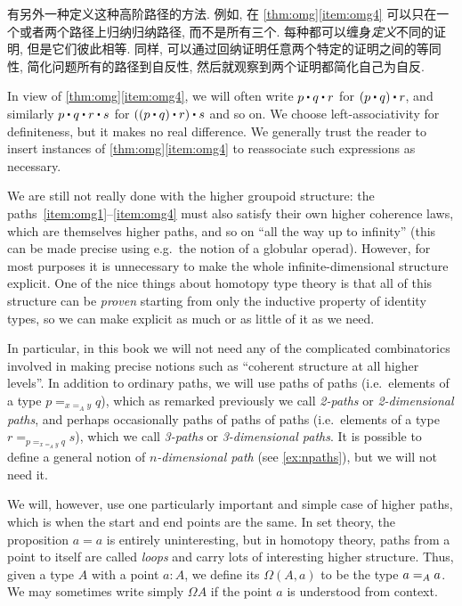 \begin{rmk}
有另外一种定义这种高阶路径的方法.
例如, 在 \cref{thm:omg}\ref{item:omg4} 可以只在一个或者两个路径上归纳归纳路径, 而不是所有三个.
每种都可以缠身\emph{定义}不同的证明, 但是它们彼此相等.
同样, 可以通过回纳证明任意两个特定的证明之间的等同性, 简化问题所有的路径到自反性, 然后就观察到两个证明都简化自己为自反.
\end{rmk}

In view of \cref{thm:omg}\ref{item:omg4}, we will often write $p\ct q\ct r$ for $(p\ct q)\ct r$, and similarly $p\ct q\ct r \ct s$ for $((p\ct q)\ct r)\ct s$ and so on. We choose left-associativity for definiteness, but it makes no real difference. We generally trust the reader to insert instances of \cref{thm:omg}\ref{item:omg4} to reassociate such expressions as necessary. 

We are still not really done with the higher groupoid structure: the paths~\ref{item:omg1}--\ref{item:omg4} must also satisfy their own higher coherence laws, which are themselves higher paths, %
%
%
%
and so on ``all the way up to infinity'' (this can be made precise using e.g.\ the notion of a globular operad). However, for most purposes it is unnecessary to make the whole infinite-dimensional structure explicit. One of the nice things about homotopy type theory is that all of this structure can be \emph{proven} starting from only the inductive property of identity types, so we can make explicit as much or as little of it as we need. 

In particular, in this book we will not need any of the complicated combinatorics involved in making precise notions such as ``coherent structure at all higher levels''. In addition to ordinary paths, we will use paths of paths (i.e.\ elements of a type $p =_{x=_A y} q$), which as remarked previously we call \emph{2-paths} or \emph{2-dimensional paths}, and perhaps occasionally paths of paths of paths (i.e.\ elements of a type $r = _{p =_{x=_A y} q} s$), which we call \emph{3-paths} or \emph{3-dimensional paths}. It is possible to define a general notion of \emph{$n$-dimensional path} %
%
%
%
(see \cref{ex:npaths}), but we will not need it. 

We will, however, use one particularly important and simple case of higher paths, which is when the start and end points are the same. In set theory, the proposition $a=a$ is entirely uninteresting, but in homotopy theory, paths from a point to itself are called \emph{loops} and carry lots of interesting higher structure. Thus, given a type $A$ with a point $a:A$, we define its  %
$\Omega(A,a)$ to be the type $\id[A]{a}{a}$. We may sometimes write simply $\Omega A$ if the point $a$ is understood from context. 

